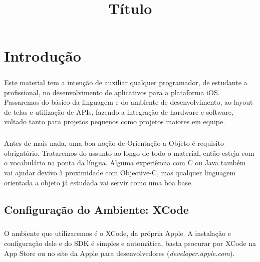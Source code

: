 \documentclass[a4paper,12pt,brazil,doubleside]{book}
\title{Título}
\begin{document}

\cleardoublepage

\onehalfspace

\pagestyle{plain}

\setcounter{tocdepth}{1} %
\tableofcontents
\clearpage %

\lstset{language=[Objective]C}

\listoffigures
{}
\clearpage %
\thispagestyle{empty}

\lstlistoflistings
{}
\clearpage %
\thispagestyle{empty}

\chapter{Introdução}

\paragraph{}Este material tem a intenção de auxiliar qualquer programador, de estudante a profissional, no desenvolvimento de aplicativos para a plataforma iOS. Passaremos do básico da linguagem e do ambiente de desenvolvimento, ao layout de telas e utilização de APIs, fazendo a integração de hardware e software, voltado tanto para projetos pequenos como projetos maiores em equipe.
\paragraph{}Antes de mais nada, uma boa noção de Orientação a Objeto é requisito obrigatório. Trataremos do assunto ao longo de todo o material, então esteja com o vocabulário na ponta da língua. Alguma experiência com C ou Java também vai ajudar devivo à proximidade com Objective-C, mas qualquer linguagem orientada a objeto já estudada vai servir como uma boa base.

\bigskip
\bigskip

\section{Configuração do Ambiente: XCode}

\paragraph{}O ambiente que utilizaremos é o XCode, da própria Apple. A instalação e configuração dele e do SDK é simples e automática, basta procurar por XCode na App Store ou no site da Apple para desenvolvedores (\textit{developer.apple.com}).
\end{document}
